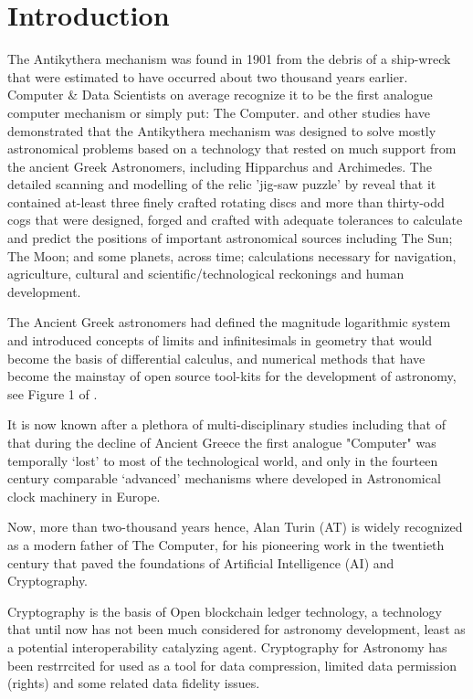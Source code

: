 \documentclass[final,5p,times,twocolumn,authoryear]{elsarticle}
\begin{document}
\section{Introduction}
\label{sec:intro}
%
 The Antikythera mechanism was found in 1901 from the debris of a ship-wreck that were estimated to have occurred about two thousand years earlier. Computer \& Data Scientists on average recognize it to be the first analogue computer mechanism or simply put: The Computer. \citet{Freeth2021} and other studies have demonstrated that the Antikythera mechanism was designed to solve mostly astronomical problems based on a technology that rested on much support from the ancient Greek Astronomers, including Hipparchus and Archimedes. The detailed scanning and modelling of the relic 'jig-saw puzzle' by \citet{Freeth2021} reveal that it contained at-least three finely crafted rotating discs and more than thirty-odd cogs that were designed, forged and crafted with adequate tolerances to calculate and predict the positions of important astronomical sources including The Sun; The Moon; and some planets, across time; calculations necessary for navigation, agriculture, cultural and scientific/technological reckonings and human development.
 
 The Ancient Greek astronomers had defined the magnitude logarithmic system and introduced concepts of limits and infinitesimals in geometry that would become the basis of differential calculus, and numerical methods that have become the mainstay of open source tool-kits for the development of astronomy, see Figure 1 of \cite{2022arXiv220614220T}.
 
 It is now known after a plethora of multi-disciplinary studies including that of \citet{Freeth2021} that during the decline of Ancient Greece the first analogue "Computer" was temporally `lost' to most of the technological world, and only in the fourteen century comparable `advanced' mechanisms where developed in Astronomical clock machinery in Europe. 
 
 Now, more than two-thousand years hence, Alan Turin (AT) is widely recognized as a modern father of The Computer, for his pioneering  work in the twentieth century that paved the foundations of Artificial Intelligence (AI) and Cryptography. 
 
Cryptography is the basis of Open blockchain ledger technology, a technology that until now has not been much considered for astronomy development, least as a potential interoperability catalyzing agent. Cryptography for Astronomy has been restrrcited for used as a tool for data compression, limited data permission (rights) and some related data fidelity issues.
\end{document}
